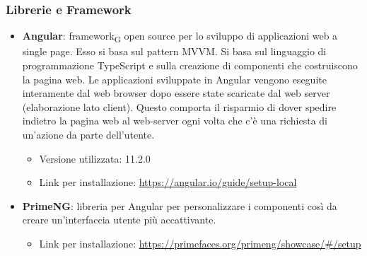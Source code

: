 \subsubsection{Librerie e Framework}

\begin{itemize}
	\item \textbf{Angular}: framework\textsubscript{G} open source per lo sviluppo di applicazioni web a single page. Esso si basa sul pattern MVVM. Si basa sul linguaggio di programmazione TypeScript e sulla creazione di componenti che costruiscono la pagina web. Le applicazioni sviluppate in Angular vengono eseguite interamente dal web browser dopo essere state scaricate dal web server (elaborazione lato client). Questo comporta il risparmio di dover spedire indietro la pagina web al web-server ogni volta che c'è una richiesta di un'azione da parte dell'utente.
	\begin{itemize}
		\item Versione utilizzata: 11.2.0
		\item Link per installazione: \url{https://angular.io/guide/setup-local}
	\end{itemize}
 	\item \textbf{PrimeNG}: libreria per Angular per personalizzare i componenti così da creare un'interfaccia utente più accattivante.
	 \begin{itemize}
		\item Link per installazione: \url{https://primefaces.org/primeng/showcase/#/setup}
	\end{itemize}

	
\end{itemize}